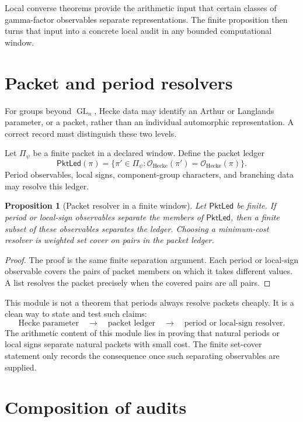 \documentclass[11pt]{article}
\newtheorem{proposition}[theorem]{Proposition}
\begin{document}
Local converse theorems provide the arithmetic input that certain classes of gamma-factor observables separate representations.  The finite proposition then turns that input into a concrete local audit in any bounded computational window.

\section{Packet and period resolvers}

For groups beyond \(\operatorname{GL}_n\), Hecke data may identify an Arthur or Langlands parameter, or a packet, rather than an individual automorphic representation.  A correct record must distinguish these two levels.

Let \(\Pi_\psi\) be a finite packet in a declared window.  Define the packet ledger
\[
\mathsf{PktLed}(\pi)=
\{\pi'\in\Pi_\psi:
\mathcal O_{\mathrm{Hecke}}(\pi')=
\mathcal O_{\mathrm{Hecke}}(\pi)\}.
\]
Period observables, local signs, component-group characters, and branching data may resolve this ledger.

\begin{proposition}[Packet resolver in a finite window]
Let \(\mathsf{PktLed}\) be finite.  If period or local-sign observables separate the members of \(\mathsf{PktLed}\), then a finite subset of these observables separates the ledger.  Choosing a minimum-cost resolver is weighted set cover on pairs in the packet ledger.
\end{proposition}

\begin{proof}
The proof is the same finite separation argument.  Each period or local-sign observable covers the pairs of packet members on which it takes different values.  A list resolves the packet precisely when the covered pairs are all pairs.
\end{proof}

This module is not a theorem that periods always resolve packets cheaply.  It is a clean way to state and test such claims:
\[
\text{Hecke parameter}
\quad\longrightarrow\quad
\text{packet ledger}
\quad\longrightarrow\quad
\text{period or local-sign resolver}.
\]
The arithmetic content of this module lies in proving that natural periods or local signs separate natural packets with small cost.  The finite set-cover statement only records the consequence once such separating observables are supplied.

\section{Composition of audits}
\end{document}
